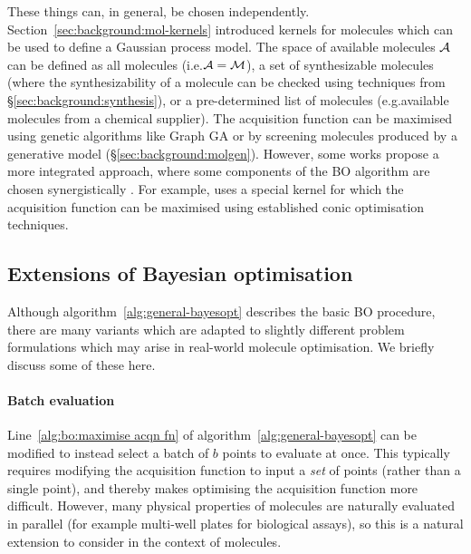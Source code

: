 These things can, in general, be chosen independently.
Section~\ref{sec:background:mol-kernels} introduced kernels
for molecules which can be used to define a Gaussian process model.
The space of available molecules $\mathcal{A}$ can be defined
as all molecules (i.e.\@ $\mathcal{A}=\mathcal{M}$),
a set of synthesizable molecules
(where the synthesizability of a molecule can be checked using techniques
from \S\ref{sec:background:synthesis}),
or a pre-determined list of molecules (e.g.\@ available molecules from a chemical supplier).
The acquisition function can be maximised using genetic algorithms like Graph GA \citep{jensen2019graph}
or by screening molecules produced by a generative model (\S\ref{sec:background:molgen}).
However, some works propose a more integrated approach,
where some components of the BO algorithm are chosen synergistically
\citep{%
    baptista2018bayesian,%
    kim2019bayesian,%
    daxberger2019mixed,%
    oh2019combinatorial,%
    kandasamy2015high,%
    mutny2018efficient,%
    hoang2018decentralized,%
    korovina2020chembo%
}.
For example, \citet{thebelt2022tree} uses a special kernel for which
the acquisition function can be maximised using established conic optimisation techniques.

\subsection{Extensions of Bayesian optimisation}
\label{sec:background:bayesopt:extensions}

Although algorithm~\ref{alg:general-bayesopt} describes the basic BO procedure,
there are many variants which are adapted to slightly different problem formulations
which may arise in real-world molecule optimisation.
We briefly discuss some of these here.

\paragraph{Batch evaluation}
Line~\ref{alg:bo:maximise acqn fn} of algorithm~\ref{alg:general-bayesopt} can be modified
to instead select a batch of $b$ points to evaluate at once.
This typically requires modifying the acquisition function to input a \emph{set}
of points (rather than a single point),
and thereby makes optimising the acquisition function more difficult.
However, many physical properties of molecules are naturally evaluated in parallel
(for example multi-well plates for biological assays),
so this is a natural extension to consider in the context of molecules.

